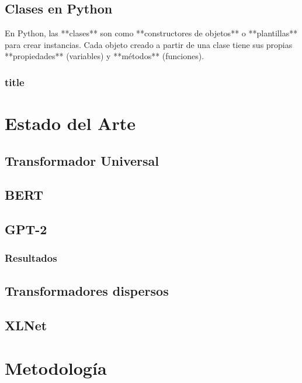\documentclass[conference]{IEEEtran}
\begin{document}
	\subsection{Clases en Python}
		En Python, las **clases** son como **constructores de objetos** o 
		**plantillas** para crear instancias. Cada objeto creado a partir de
		una clase tiene sus propias **propiedades** (variables) y **métodos** (funciones).
		\subsubsection{title}





\section{Estado del Arte}


\subsection{Transformador Universal}

	\subsection{BERT}



	\subsection{GPT-2}


		\subsubsection{Resultados}



	\subsection{Transformadores dispersos}



	\subsection{XLNet}


\section{Metodolog\'ia}
\end{document}
